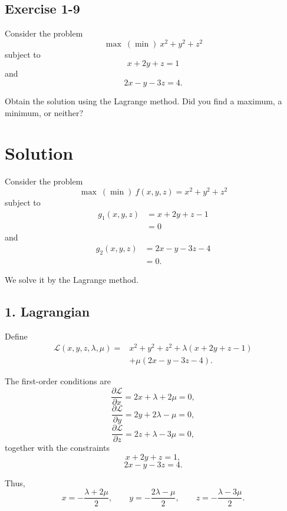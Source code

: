 \vspace{30pt}
\begin{tcolorbox}[breakable]

\subsection*{Exercise 1-9}

Consider the problem
\[
\max \ (\min)\ x^2 + y^2 + z^2
\]
subject to
\[
x + 2y + z = 1
\]
and
\[
2x - y - 3z = 4.
\]

Obtain the solution using the Lagrange method.
Did you find a maximum, a minimum, or neither?

\end{tcolorbox}



\section*{Solution}

Consider the problem
\[
\max \ (\min)\ f(x,y,z)=x^2+y^2+z^2
\]
subject to
\[
\begin{aligned}
g_1(x,y,z)
&=x+2y+z-1\\
&=0
\end{aligned}
\]
and
\[
\begin{aligned}
g_2(x,y,z)
&=2x-y-3z-4\\
&=0.
\end{aligned}
\]

We solve it by the Lagrange method.

\subsection*{1. Lagrangian}

Define
\[
\begin{aligned}
\mathcal{L}(x,y,z,\lambda,\mu)
=
&x^2+y^2+z^2
+\lambda(x+2y+z-1)\\
&+\mu(2x-y-3z-4).
\end{aligned}
\]

The first-order conditions are
\[
\frac{\partial \mathcal{L}}{\partial x}=2x+\lambda+2\mu=0,
\]
\[
\frac{\partial \mathcal{L}}{\partial y}=2y+2\lambda-\mu=0,
\]
\[
\frac{\partial \mathcal{L}}{\partial z}=2z+\lambda-3\mu=0,
\]
together with the constraints
\[
x+2y+z=1,
\]
\[
2x-y-3z=4.
\]

Thus,
\[
x=-\frac{\lambda+2\mu}{2},\qquad
y=-\frac{2\lambda-\mu}{2},\qquad
z=-\frac{\lambda-3\mu}{2}.
\]

